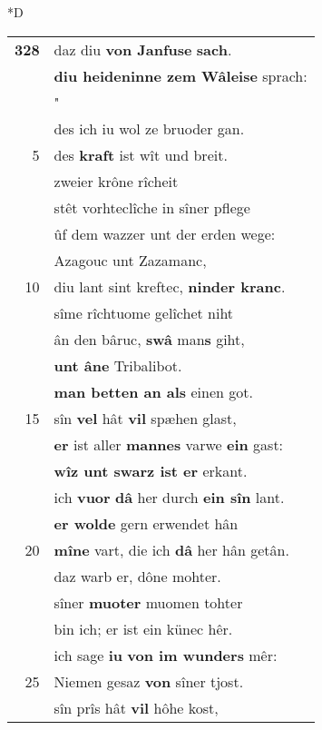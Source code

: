 \documentclass[8pt,a4paper,notitlepage]{article}
\begin{document}
\begin{table}[ht]
\begin{minipage}[t]{0.5\linewidth}
\small
\begin{center}*D
\end{center}
\begin{tabular}{rl}
\textbf{328} & daz diu \textbf{von Janfuse} \textbf{sach}.\\ 
 & \textbf{diu heideninne zem Wâleise} sprach:\\ 
 & "\textit{\begin{large}C\end{large}}undrie nant uns einen man,\\ 
 & des ich iu wol ze bruoder gan.\\ 
5 & des \textbf{kraft} ist wît und breit.\\ 
 & zweier krône rîcheit\\ 
 & stêt vorhteclîche in sîner pflege\\ 
 & ûf dem wazzer unt der erden wege:\\ 
 & Azagouc unt Zazamanc,\\ 
10 & diu lant sint kreftec, \textbf{ninder kranc}.\\ 
 & sîme rîchtuome gelîchet niht\\ 
 & ân den bâruc, \textbf{swâ} man\textbf{s} giht,\\ 
 & \textbf{unt âne} Tribalibot.\\ 
 & \textbf{man betten an als} einen got.\\ 
15 & sîn \textbf{vel} hât \textbf{vil} spæhen glast,\\ 
 & \textbf{er} ist aller \textbf{mannes} varwe \textbf{ein} gast:\\ 
 & \textbf{wîz unt swarz ist er} erkant.\\ 
 & ich \textbf{vuor} \textbf{dâ} her durch \textbf{ein sîn} lant.\\ 
 & \textbf{er wolde} gern erwendet hân\\ 
20 & \textbf{mîne} vart, die ich \textbf{dâ} her hân getân.\\ 
 & daz warb er, dône mohter.\\ 
 & sîner \textbf{muoter} muomen tohter\\ 
 & bin ich; er ist ein künec hêr.\\ 
 & ich sage \textbf{iu} \textbf{von im wunders} mêr:\\ 
25 & Niemen gesaz \textbf{von} sîner tjost.\\ 
 & sîn prîs hât \textbf{vil} hôhe kost,\\ 

\end{tabular}
\end{minipage}
\end{table}
\end{document}
